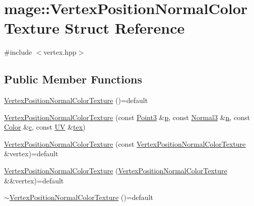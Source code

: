 \hypertarget{structmage_1_1_vertex_position_normal_color_texture}{}\section{mage\+:\+:Vertex\+Position\+Normal\+Color\+Texture Struct Reference}
\label{structmage_1_1_vertex_position_normal_color_texture}


{\ttfamily \#include $<$vertex.\+hpp$>$}

\subsection*{Public Member Functions}
\begin{DoxyCompactItemize}
\item 
\hyperlink{structmage_1_1_vertex_position_normal_color_texture_ae90b4ebe4ebe0fb3ddec941dca6a2dc1}{Vertex\+Position\+Normal\+Color\+Texture} ()=default
\item 
\hyperlink{structmage_1_1_vertex_position_normal_color_texture_add4b29aa1d788ab6a3e0744f43f9ae63}{Vertex\+Position\+Normal\+Color\+Texture} (const \hyperlink{structmage_1_1_point3}{Point3} \&\hyperlink{structmage_1_1_vertex_position_normal_color_texture_ac7808865ca6672b7d0f4f8457077bd16}{p}, const \hyperlink{structmage_1_1_normal3}{Normal3} \&\hyperlink{structmage_1_1_vertex_position_normal_color_texture_a7304bf677ad4f16aea974e63f4324eba}{n}, const \hyperlink{structmage_1_1_color}{Color} \&\hyperlink{structmage_1_1_vertex_position_normal_color_texture_a6b28cefeab374c3f38c44b49eea2ec78}{c}, const \hyperlink{structmage_1_1_u_v}{UV} \&\hyperlink{structmage_1_1_vertex_position_normal_color_texture_a3477ce06d0778a1119cbf2e961d7c3ed}{tex})
\item 
\hyperlink{structmage_1_1_vertex_position_normal_color_texture_a3ecf095fd4f4f70aa8f54f1d0b9d72fb}{Vertex\+Position\+Normal\+Color\+Texture} (const \hyperlink{structmage_1_1_vertex_position_normal_color_texture}{Vertex\+Position\+Normal\+Color\+Texture} \&vertex)=default
\item 
\hyperlink{structmage_1_1_vertex_position_normal_color_texture_aa23061d16a1c231debc79d44db8f0a6e}{Vertex\+Position\+Normal\+Color\+Texture} (\hyperlink{structmage_1_1_vertex_position_normal_color_texture}{Vertex\+Position\+Normal\+Color\+Texture} \&\&vertex)=default
\item 
\hyperlink{structmage_1_1_vertex_position_normal_color_texture_af3538a12eab74715dd9b5256f8765162}{$\sim$\+Vertex\+Position\+Normal\+Color\+Texture} ()=default

\end{DoxyCompactItemize}
